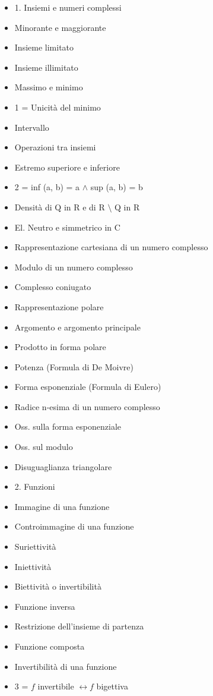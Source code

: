 \begin{itemize}
\item 1. Insiemi e numeri complessi
\item Minorante e maggiorante
\item Insieme limitato
\item Insieme illimitato
\item Massimo e minimo
\item 1 = Unicità del minimo
\item Intervallo
\item Operazioni tra insiemi
\item Estremo superiore e inferiore
\item 2 = inf (a, b) = a $\land$ sup (a, b) = b
\item Densità di Q in R e di R $\setminus$ Q in R
\item El. Neutro e simmetrico in C
\item Rappresentazione cartesiana di un numero complesso
\item Modulo di un numero complesso
\item Complesso coniugato
\item Rappresentazione polare
\item Argomento e argomento principale
\item Prodotto in forma polare
\item Potenza (Formula di De Moivre)
\item Forma esponenziale (Formula di Eulero)
\item Radice n-esima di un numero complesso
\item Oss. sulla forma esponenziale
\item Oss. sul modulo
\item Disuguaglianza triangolare
\item 2. Funzioni
\item Immagine di una funzione
\item Controimmagine di una funzione
\item Suriettività
\item Iniettività
\item Biettività o invertibilità
\item Funzione inversa
\item Restrizione dell’insieme di partenza
\item Funzione composta
\item Invertibilità di una funzione
\item 3 = $f$ invertibile $\leftrightarrow f$ bigettiva

\end{itemize}
